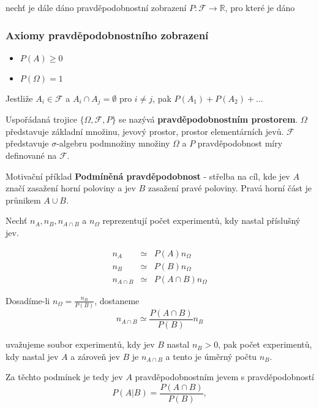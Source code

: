 		nechť je dále dáno pravděpodobnostní zobrazení $P: \mathscr{F}\to\mathbb{R}$, pro které je dáno
	\subsubsection*{Axiomy pravděpodobnostního zobrazení}
		\begin{itemize}[noitemsep]
			\item $P(A)\geq 0$
			\item $P(\Omega)=1$
		\end{itemize}

		Jestliže $A_i\in\mathscr{F}$ a $A_i\cap A_j=\emptyset$ pro $i\neq j$, pak $P(A_1)+P(A_2)+\ldots$\br

		Uspořádaná trojice $\{\Omega,\mathscr{F},P\}$ se nazývá \textbf{pravděpodobnostním prostorem}. $\Omega$ představuje základní množinu, jevový prostor, prostor elementárních jevů. $\mathscr{F}$ představuje $\sigma$-algebru podmnožiny množiny $\Omega$ a $P$ pravděpodobnost míry definované na $\mathscr{F}$.

		\begin{note}{Motivační příklad}
		\textbf{Podmíněná pravděpodobnost} - střelba na cíl, kde jev $A$ značí zasažení horní poloviny a jev $B$ zasažení pravé poloviny. Pravá horní část je průnikem $A\cup B$.\br

		\begin{figure}
			
		\end{figure}
		\end{note}

		Nechť $n_A,n_B, n_{A\cap B}$ a $n_\Omega$ reprezentují počet experimentů, kdy nastal příslušný jev.

		\begin{eqnarray*}
			n_A & \simeq & P(A)n_\Omega\\
			n_B & \simeq & P(B)n_\Omega\\
			n_{A\cap B} & \simeq & P(A\cap B)n_\Omega
		\end{eqnarray*}

		Dosadíme-li $n_\Omega=\frac{n_B}{P(B)}$, dostaneme
		\[ n_{A\cap B} \simeq \frac{P(A\cap B)}{P(B)}n_B \]

		uvažujeme soubor experimentů, kdy jev $B$ nastal $n_B>0$, pak počet experimentů, kdy nastal jev $A$ a zároveň jev $B$ je $n_{A\cap B}$ a tento je úměrný počtu $n_B$.\br

		Za těchto podmínek je tedy jev $A$ pravděpodobnostním jevem s pravděpodobností
		\[ P(A|B) = \frac{P(A\cap B)}{P(B)}, \]

